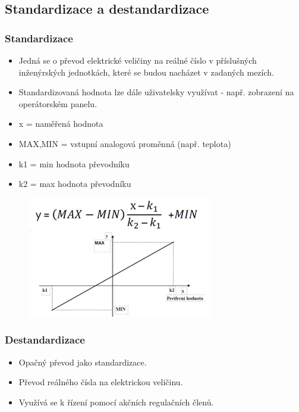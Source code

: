   \subsection{Standardizace a destandardizace}
  \subsubsection*{Standardizace}
  \begin{itemize}
    \item Jedná se o převod elektrické veličiny na reálné číslo v příslušných inženýrských jednotkách, které se budou nacházet v zadaných mezích.
    \item Standardizovaná hodnota lze dále uživatelsky využívat - např. zobrazení na operátorském panelu.
    \item x = naměřená hodnota
    \item MAX,MIN = vstupní analogová proměnná (např. teplota)
    \item k1 = min hodnota převodníku
    \item k2 = max hodnota převodníku 
  \end{itemize}

  \begin{figure}[h]
    \begin{center}
      \includegraphics[scale = 1]{img/picture6.png}
    \end{center}
  \end{figure}

\subsubsection*{Destandardizace}
\begin{itemize}
  \item Opačný převod jako standardizace. 
  \item Převod reálného čísla na elektrickou veličinu.
  \item Využívá se k řízení pomocí akčních regulačních členů.
\end{itemize}

